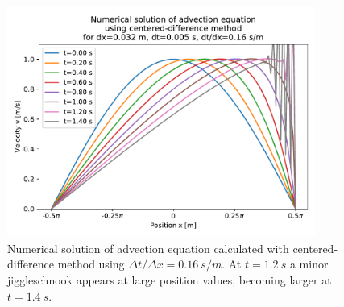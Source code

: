 \begin{figure}[H]
  \centering
  \includegraphics[width=0.9\textwidth]{figures/numerical/centred_nx_100_nt_281_2d.pdf}
  \vspace*{-5mm}
  \caption{Numerical solution of advection equation calculated with centered-difference method using $\Delta t / \Delta x = 0.16 \ s/m$. At $t = 1.2 \ s$ a minor jiggleschnook appears at large position values, becoming larger at $t = 1.4 \ s$.}
  \label{fig_centred_nx_100_nt_281_2d}
  \vspace*{-10mm}
\end{figure}


